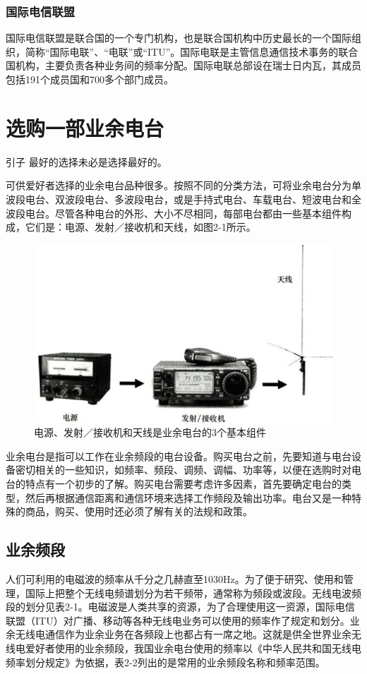 \documentclass[12pt,UTF8]{ctexbook}
\begin{document}
\subsection{国际电信联盟}

国际电信联盟是联合国的一个专门机构，也是联合国机构中历史最长的一个国际组织，简称“国际电联”、“电联”或“ITU”。国际电联是主管信息通信技术事务的联合国机构，主要负责各种业务间的频率分配。国际电联总部设在瑞士日内瓦，其成员包括191个成员国和700多个部门成员。

\chapter{选购一部业余电台}

引子
最好的选择未必是选择最好的。

可供爱好者选择的业余电台品种很多。按照不同的分类方法，可将业余电台分为单波段电台、双波段电台、多波段电台，或是手持式电台、车载电台、短波电台和全波段电台。尽管各种电台的外形、大小不尽相同，每部电台都由一些基本组件构成，它们是：电源、发射／接收机和天线，如图2-1所示。

\begin{figure}[htbp]
	\centering
	\includegraphics[width=0.7\linewidth]{16}
	\caption{电源、发射／接收机和天线是业余电台的3个基本组件}
	\label{fig:1}
\end{figure}

业余电台是指可以工作在业余频段的电台设备。购买电台之前，先要知道与电台设备密切相关的一些知识，如频率、频段、调频、调幅、功率等，以便在选购时对电台的特点有一个初步的了解。购买电台需要考虑许多因素，首先要确定电台的类型，然后再根据通信距离和通信环境来选择工作频段及输出功率。电台又是一种特殊的商品，购买、使用时还必须了解有关的法规和政策。

\section{业余频段}

人们可利用的电磁波的频率从千分之几赫直至1030Hz。为了便于研究、使用和管理，国际上把整个无线电频谱划分为若干频带，通常称为频段或波段。无线电波频段的划分见表2-1。电磁波是人类共享的资源，为了合理使用这一资源，国际电信联盟（ITU）对广播、移动等各种无线电业务可以使用的频率作了规定和划分。业余无线电通信作为业余业务在各频段上也都占有一席之地。这就是供全世界业余无线电爱好者使用的业余频段，我国业余电台使用的频率以《中华人民共和国无线电频率划分规定》为依据，表2-2列出的是常用的业余频段名称和频率范围。
\end{document}
